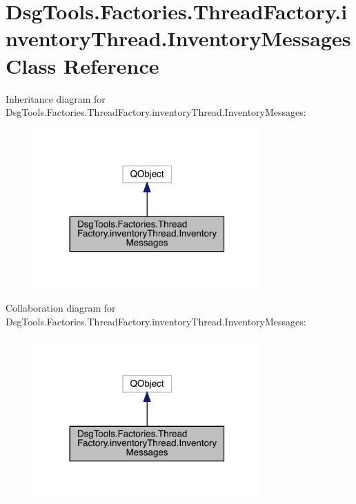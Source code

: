 \hypertarget{class_dsg_tools_1_1_factories_1_1_thread_factory_1_1inventory_thread_1_1_inventory_messages}{}\section{Dsg\+Tools.\+Factories.\+Thread\+Factory.\+inventory\+Thread.\+Inventory\+Messages Class Reference}
\label{class_dsg_tools_1_1_factories_1_1_thread_factory_1_1inventory_thread_1_1_inventory_messages}


Inheritance diagram for Dsg\+Tools.\+Factories.\+Thread\+Factory.\+inventory\+Thread.\+Inventory\+Messages\+:
\nopagebreak
\begin{figure}[H]
\begin{center}
\leavevmode
\includegraphics[width=248pt]{class_dsg_tools_1_1_factories_1_1_thread_factory_1_1inventory_thread_1_1_inventory_messages__inherit__graph}
\end{center}
\end{figure}


Collaboration diagram for Dsg\+Tools.\+Factories.\+Thread\+Factory.\+inventory\+Thread.\+Inventory\+Messages\+:
\nopagebreak
\begin{figure}[H]
\begin{center}
\leavevmode
\includegraphics[width=248pt]{class_dsg_tools_1_1_factories_1_1_thread_factory_1_1inventory_thread_1_1_inventory_messages__coll__graph}
\end{center}
\end{figure}
